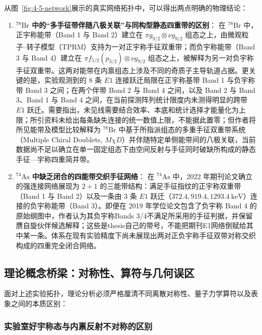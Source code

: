 从图~\ref{fig:4-5-network}展示的真实网络拓扑中，可以得出两点明确的物理结论：
\begin{enumerate}
\item \textbf{$^{78}\mathrm{Br}$ 中的“多手征带伴随八极关联”与同构型静态四重带的区别}：
在 $^{78}\mathrm{Br}$ 中，正宇称能带（Band 1 与 Band 2）建立在 $\pi g_{9/2} \otimes \nu g_{9/2}$ 组态之上，由微观粒子--转子模型（TPRM）支持为一对正宇称手征双重带；而负宇称能带（Band 3 与 Band 4）建立在 $\pi f_{5/2}(p_{3/2}) \otimes \nu g_{9/2}$ 组态之上，被解释为另一对负宇称手征双重带。这两对能带在内禀组态上涉及不同的奇质子主导轨道占据。更关键的是，实验观测到的 8 条 $E1$ 连接跃迁局限在正宇称基带 Band 1 与负宇称带 Band 3 之间；在两个伴带 Band 2 与 Band 4 之间，以及 Band 2 与 Band 3、Band 1 与 Band 4 之间，在当前探测阵列统计限度内未测得明显的跨带 $E1$ 跃迁。需要指出，未见线需要结合效率、本底和统计选择才能量化为上限；所引资料未给出每条缺失连接的统一数值上限，不能据此置零；但作者将所见能带及模型比较解释为 $^{78}\mathrm{Br}$ 中基于所指派组态的多重手征双重带系统（Multiple Chiral Doublets, $M\chi D$）并伴随特定单侧能带间的八极关联，当前数据尚不足以确立在单一固定组态下由空间反射与手征同时破缺所构成的静态手征---宇称四重简并带。
\item \textbf{$^{74}\mathrm{As}$ 中缺乏闭合的四能带交织手征网络}：
在 $^{74}\mathrm{As}$ 中，2022 年期刊论文确立的强连接网络展现为 $2+1$ 的三能带结构：满足手征指纹的正宇称双重带（Band 1 与 Band 2）以及一条由 3 条 $E1$ 跃迁（$372.4, 919.4, 1293.4\ \mathrm{keV}$）连接的负宇称能带（Band 3）。即便在 2019 年学位论文包含了负宇称 Band 4 的原始纲图中，作者认为其负宇称Bands 3/4不满足所采用的手征判据，并保留赝自旋伙伴候选解释；这些是thesis自己的带号，不能把期刊E1网络倒赋给其中某一条。体系在现有实验精度下尚未展现出两对正负宇称手征双带对称交织构成的四重完全闭合网络。
\end{enumerate}

\subsection{理论概念桥梁：对称性、算符与几何误区}\label{sec:4-5-3}

面对上述实验拓扑，理论分析必须严格厘清不同离散对称性、量子力学算符以及表象之间的本质区别：

\subsubsection{实验室好宇称态与内禀反射不对称的区别}


